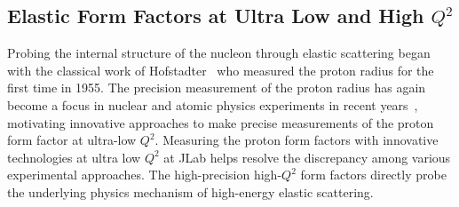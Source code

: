 \subsection{Elastic Form Factors at Ultra Low and High $Q^2$}
 
Probing the internal structure of the nucleon through elastic scattering began with the classical work of Hofstadter~\cite{Hofstadter56} who measured the proton radius for the first time in 1955. The precision measurement of the proton radius has again become a focus in nuclear and atomic physics experiments in recent years~\cite{gao2021proton}, motivating innovative approaches to make precise measurements of the proton form factor at ultra-low $Q^2$. Measuring the proton form factors with innovative technologies at ultra low $Q^2$ at JLab helps resolve the discrepancy among various experimental approaches. The high-precision high-$Q^2$ form factors directly probe the underlying physics mechanism of high-energy elastic scattering. 

